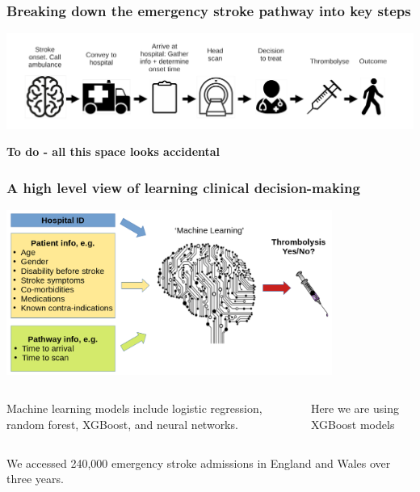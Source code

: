 \documentclass[xcolor={usenames,dvipsnames}]{beamer}
\begin{document}

\begin{frame}
\frametitle{Breaking down the emergency stroke pathway into key steps}
\begin{center}
\includegraphics[width=1.0\textwidth]{./images/pathway}
\end{center}

\textbf{To do - all this space looks accidental} 

\end{frame}



\begin{frame}
\frametitle{A high level view of learning clinical decision-making}

\includegraphics[width=0.8\textwidth]{./images/treatment_decision}


\begin{columns}
    \footnotesize
    Machine learning models include logistic regression,
    random forest, XGBoost, and neural networks. 
    
    \vspace{1em}
    
    Here we are using XGBoost models
    \normalsize 
\end{columns}



\vspace{2em}
We accessed 240,000 emergency stroke admissions in England and Wales over three years. %

\end{frame}
\end{document}
